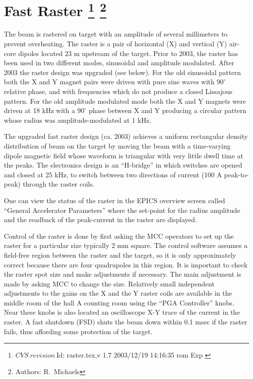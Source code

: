 \section[Fast Raster]{Fast Raster
\footnote{
  $CVS~revision~ $Id: raster.tex,v 1.7 2003/12/19 14:16:35 rom Exp $ $
}
\footnote{Authors: R.~Michaels }
}

The beam is rastered on target with an amplitude of
several millimeters to prevent overheating.  
The raster is a pair of horizontal (X) and vertical (Y)
air-core dipoles located 23 m upstream of the
target. Prior to 2003, the raster has been 
used in two different modes, sinusoidal and 
amplitude modulated.  After 2003 the raster
design was upgraded (see below).
For the old sinusoidal pattern both the X and Y magnet 
pairs were driven with pure sine waves
with $90^{\circ}$ relative phase, 
and with frequencies which do 
not produce a closed Lissajous pattern.
For the old amplitude modulated mode  
both the X and Y magnets were driven at 18 kHz with
a $90^{\circ}$ phase between X and Y producing a circular
pattern whose radius was amplitude-modulated at 1 kHz. 

The upgraded fast raster design (ca. 2003)
achieves a uniform rectangular
density distribution of beam on the target 
by moving the beam with a time-varying dipole
magnetic field whose waveform is triangular
with very little dwell time at the peaks.  
The electronics design is an ``H-bridge''
in which switches are opened and closed 
at 25 kHz, to switch between two directions 
of current (100 A peak-to-peak) 
through the raster coils.

One can view the 
status of the raster in the
EPICS overview screen called ``General Accelerator
Parameters'' where the set-point for the radius amplitude
and the readback of the peak-current in the raster are displayed.

Control of the raster is done by first asking the MCC
operators to set up the raster for a particular size
typically 2 mm square.
The control software assumes a field-free region between
the raster and the target, so it is only approximately
correct because there are four quadrupoles in this region.
It is important to check the raster spot size and
make adjustments if necessary.  The main adjustment is made
by asking MCC to change the size.
Relatively small independent adjustments to the 
gains on the X and the Y raster
coils are available in the middle room of the hall A
counting room using the ``PGA Controller'' knobs.
Near these knobs is also located an oscilloscope X-Y trace
of the current in the raster.  A fast shutdown (FSD) shuts
the beam down within 0.1 msec if the raster fails, thus
affording some protection of the target.

